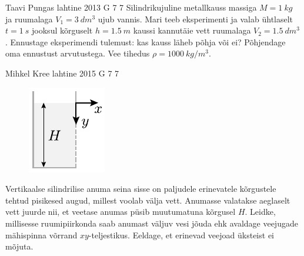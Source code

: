 \documentclass[11pt]{article}
\begin{document}
{%
{Taavi Pungas} %
{lahtine} %
{2013} %
{G 7} %
{7} %
{
\ifStatement
Silindrikujuline metallkauss massiga $M=\SI{1}{kg}$ ja ruumalaga
$V_1=\SI{3}{dm^3}$ ujub vannis. Mari teeb eksperimenti ja valab ühtlaselt
$t=\SI{1}{s}$ jooksul kõrguselt $h=\SI{1,5}{m}$ kaussi kannutäie vett ruumalaga
$V_2=\SI{1,5}{dm^3}$. Ennustage eksperimendi tulemust: kas kauss läheb põhja või
ei? Põhjendage oma ennustust arvutustega. Vee tihedus $\rho=\SI{1000}{kg/m^3}$.
\fi
}

{Mihkel Kree} %
{lahtine} %
{2015} %
{G 7} %
{7} %
{
\ifStatement
\begin{figure}%
\vspace{-15pt}
\includegraphics[width=\linewidth]{2015-lahg-07-veejoadJoon}%
\end{figure}
Vertikaalse silindrilise anuma seina sisse on paljudele erinevatele kõrgustele tehtud pisikesed augud, millest voolab välja vett. Anumasse valatakse aeglaselt vett juurde nii, et veetase anumas püsib muutumatuna kõrgusel $H$. Leidke, millisesse ruumipiirkonda saab anumast väljuv vesi jõuda ehk avaldage veejugade mähispinna võrrand $xy$-teljestikus. Eeldage, et erinevad veejoad üksteist ei mõjuta.
\fi
}

}
\end{document}
